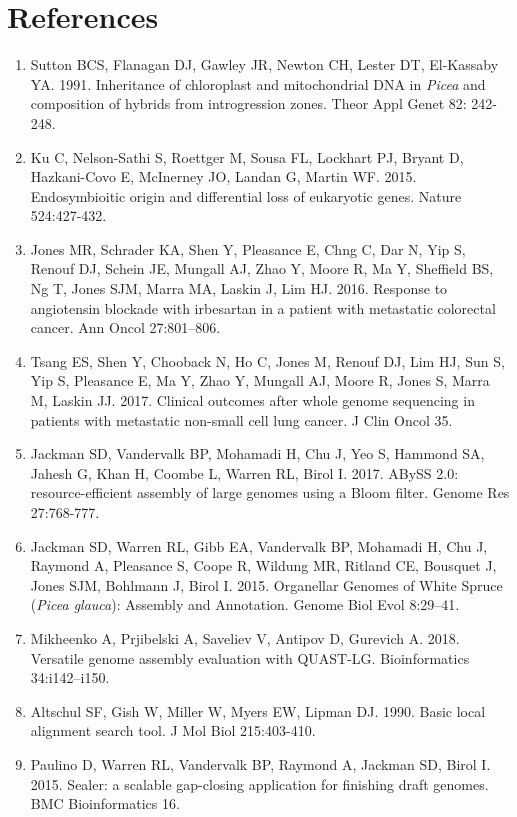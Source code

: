 \documentclass[titlepage,11pt, oneside]{article}   	%
\begin{document}
\section*{References}
\begin{enumerate}
\item Sutton BCS, Flanagan DJ, Gawley JR, Newton CH, Lester DT, El-Kassaby YA. 1991. Inheritance of chloroplast and mitochondrial DNA in \textit{Picea} and composition of hybrids from introgression zones. Theor Appl Genet 82: 242-248.
\item Ku C, Nelson-Sathi S, Roettger M, Sousa FL, Lockhart PJ, Bryant D, Hazkani-Covo E, McInerney JO, Landan G, Martin WF. 2015. Endosymbioitic origin and differential loss of eukaryotic genes. Nature 524:427-432.
\item Jones MR, Schrader KA, Shen Y, Pleasance E, Chng C, Dar N, Yip S, Renouf DJ, Schein JE, Mungall AJ, Zhao Y, Moore R, Ma Y, Sheffield BS, Ng T, Jones SJM, Marra MA, Laskin J, Lim HJ. 2016. Response to angiotensin blockade with irbesartan in a patient with metastatic colorectal cancer. Ann Oncol 27:801–806.
\item Tsang ES, Shen Y, Chooback N, Ho C, Jones M, Renouf DJ, Lim HJ, Sun S, Yip S, Pleasance E, Ma Y, Zhao Y, Mungall AJ, Moore R, Jones S, Marra M, Laskin JJ. 2017. Clinical outcomes after whole genome sequencing in patients with metastatic non-small cell lung cancer. J Clin Oncol 35.
\item Jackman SD, Vandervalk BP, Mohamadi H, Chu J, Yeo S, Hammond SA, Jahesh G, Khan H, Coombe L, Warren RL, Birol I. 2017. ABySS 2.0: resource-efficient assembly of large genomes using a Bloom filter. Genome Res 27:768-777.
\item Jackman SD, Warren RL, Gibb EA, Vandervalk BP, Mohamadi H, Chu J, Raymond A, Pleasance S, Coope R, Wildung MR, Ritland CE, Bousquet J, Jones SJM, Bohlmann J, Birol I. 2015. Organellar Genomes of White Spruce (\textit{Picea glauca}): Assembly and Annotation. Genome Biol Evol 8:29–41.
\item Mikheenko A, Prjibelski A, Saveliev V, Antipov D, Gurevich A. 2018. Versatile genome assembly evaluation with QUAST-LG. Bioinformatics 34:i142–i150.
\item Altschul SF, Gish W, Miller W, Myers EW, Lipman DJ. 1990. Basic local alignment search tool. J Mol Biol 215:403-410.
\item Paulino D, Warren RL, Vandervalk BP, Raymond A, Jackman SD, Birol I. 2015. Sealer: a scalable gap-closing application for finishing draft genomes. BMC Bioinformatics 16.

\end{enumerate}
\end{document}
